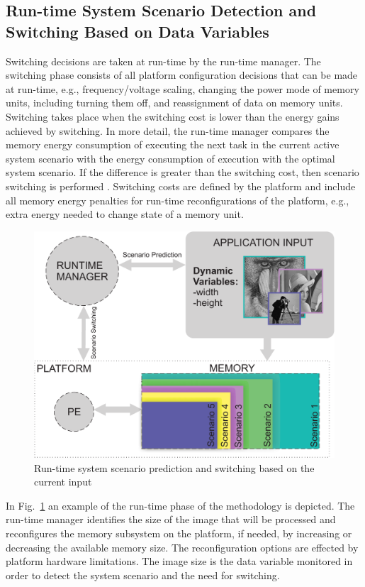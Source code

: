 \subsection{Run-time System Scenario Detection and Switching Based on Data Variables}

Switching decisions are taken at run-time by the run-time manager. The switching phase consists of all platform configuration decisions that can be made at run-time, e.g., frequency/voltage scaling, changing the power mode of memory units, including turning them off, and reassignment of data on memory units. Switching takes place when the switching cost is lower than the energy gains achieved by switching. In more detail, the run-time manager compares the memory energy consumption of executing the next task in the current active system scenario with the energy consumption of execution with the optimal system scenario. If the difference is greater than the switching cost, then scenario switching is performed \cite{tcm}. Switching costs are defined by the platform and include all memory energy penalties for run-time reconfigurations of the platform, e.g., extra energy needed to change state of a memory unit.

\begin{figure}[!t]
\centering
\includegraphics[width=\textwidth]{B/Images/switching.pdf}
\caption{Run-time system scenario prediction and switching based on the current input}
\label{fig:runtime}
\end{figure}

In Fig.~\ref{fig:runtime} an example of the run-time phase of the methodology is depicted. The run-time manager identifies the size of the image that will be processed and reconfigures the memory subsystem on the platform, if needed, by increasing or decreasing the available memory size. The reconfiguration options are effected by platform hardware limitations. The image size is the data variable monitored in order to detect the system scenario and the need for switching.

